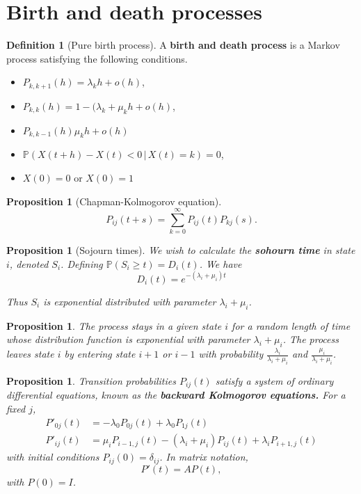 \documentclass[10pt, oneside, reqno]{amsart}
\theoremstyle{plain}%
\newtheorem{prop}[thm]{Proposition}
\theoremstyle{definition}
\newtheorem{defn}[thm]{Definition}
\theoremstyle{remark}
\newcommand{\prob}[1]{\mathbb{P}(#1)}
\newcommand{\given}{ \, | \,}
\begin{document}
\section{Birth and death processes} %
\label{sub:birth_and_death_processes}
\begin{defn}[Pure birth process]
	A \textbf{birth and death process} is a Markov process satisfying the following conditions.
	\begin{itemize}
		\item $P_{k,k+1}(h) = \lambda_k h + o(h)$,
		\item $P_{k,k}(h) = 1 - (\lambda_k + \mu_k h + o(h)$,
		\item $P_{k,k-1}(h) \mu_k h + o(h)$
		\item $\prob{X(t+h) - X(t) < 0 \given X(t) = k} = 0$,
		\item $X(0) = 0$ or $X(0) = 1$
	\end{itemize}
\end{defn}

\begin{prop}[Chapman-Kolmogorov equation]
	\[
		P_{ij}(t+s) = \sum_{k=0}^\infty P_{ij}(t) P_{kj}(s).
	\]
\end{prop}

\begin{prop}[Sojourn times]
	We wish to calculate the \textbf{sohourn time} in state $i$, denoted $S_i$.  Defining $\prob{S_i \geq t} = D_i(t)$. We have \[
		D_i(t) = e^{-(\lambda_i + \mu_i)t}
	\]
	
	Thus $S_i$ is exponential distributed with parameter $\lambda_i + \mu_i$.
\end{prop}

\begin{prop}
	The process stays in a given state $i$ for a random length of time whose distribution function is exponential with parameter $\lambda_i + \mu_i$.  The process leaves state $i$ by entering state $i+1$ or $i -1 $ with probability $\frac{\lambda_i}{\lambda_i + \mu_i}$ and $\frac{\mu_i}{\lambda_i + \mu_i}$.
\end{prop}

\begin{prop}
	Transition probabilities $P_{ij}(t)$ satisfy a system of ordinary differential equations, known as the \textbf{backward Kolmogorov equations.}  For a fixed $j$, 
	\begin{align*}
		P'_{0j}(t) &= -\lambda_0 P_{0j}(t) + \lambda_0 P_{1j}(t) \\
		P'_{ij}(t) &= \mu_i P_{i-1,j}(t) - (\lambda_i + \mu_i)P_{ij}(t) + \lambda_i P_{i+1,j}(t)
	\end{align*} with initial conditions $P_{ij}(0) = \delta_{ij}$.  In matrix notation, \[
		P'(t)  = AP(t),
	\] with $P(0) = I$.
\end{prop}
\end{document}
